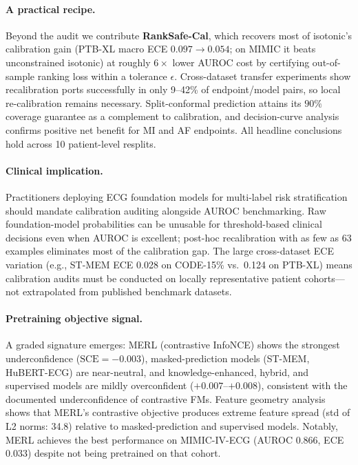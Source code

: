 \paragraph{A practical recipe.}
Beyond the audit we contribute \textbf{RankSafe-Cal}, which recovers most of isotonic's
calibration gain (PTB-XL macro ECE $0.097\!\to\!0.054$; on MIMIC it beats unconstrained
isotonic) at roughly $6\times$ lower AUROC cost by certifying out-of-sample ranking loss
within a tolerance $\epsilon$. Cross-dataset transfer experiments show recalibration ports
successfully in only 9--42\% of endpoint/model pairs, so local re-calibration remains
necessary. Split-conformal prediction attains its $90\%$ coverage guarantee as a complement
to calibration, and decision-curve analysis confirms positive net benefit for MI and AF
endpoints. All headline conclusions hold across 10 patient-level resplits.

\paragraph{Clinical implication.}
Practitioners deploying ECG foundation models for multi-label risk stratification should
mandate calibration auditing alongside AUROC benchmarking. Raw foundation-model
probabilities can be unusable for threshold-based clinical decisions even when AUROC is
excellent; post-hoc recalibration with as few as 63 examples eliminates most of the
calibration gap. The large cross-dataset ECE variation (e.g., ST-MEM ECE 0.028 on
CODE-15\% vs.\ 0.124 on PTB-XL) means calibration audits must be conducted on locally
representative patient cohorts---not extrapolated from published benchmark datasets.

\paragraph{Pretraining objective signal.}
A graded signature emerges: MERL (contrastive InfoNCE) shows the strongest underconfidence
($\text{SCE}=-0.003$), masked-prediction models (ST-MEM, HuBERT-ECG) are near-neutral, and
knowledge-enhanced, hybrid, and supervised models are mildly overconfident
($+0.007$--$+0.008$), consistent with the documented underconfidence of
contrastive FMs. Feature geometry analysis shows that MERL's contrastive objective
produces extreme feature spread (std of L2 norms: 34.8) relative to masked-prediction
and supervised models. Notably, MERL achieves the best performance on MIMIC-IV-ECG
(AUROC 0.866, ECE 0.033) despite not being pretrained on that cohort.

